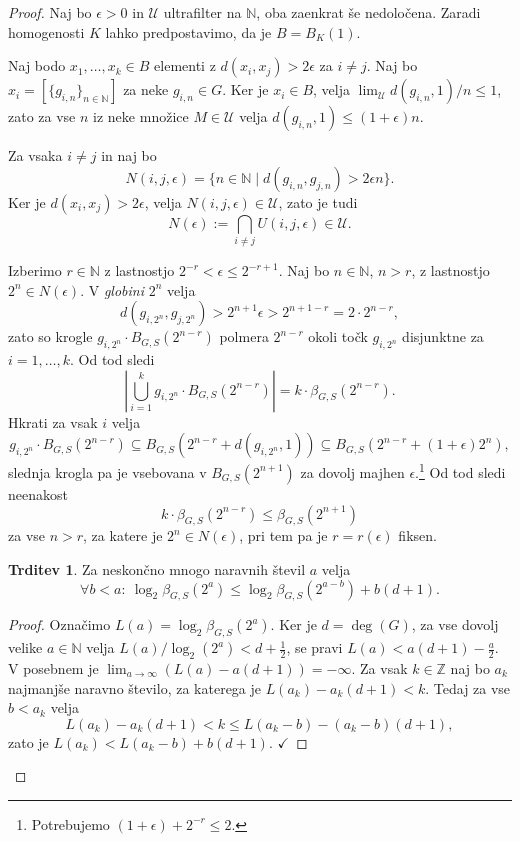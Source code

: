 \documentclass[11pt]{book}
\def\NN{\mathbb{N}}
\def\ZZ{\mathbb{Z}}
\def\UU{\mathcal{U}}
\def\kljuka{$\checkmark$}
\theoremstyle{definition}
\theoremstyle{zgled}
\theoremstyle{odprtproblem}
\theoremstyle{domacanaloga}
\newenvironment{dokaz}
    {\color{siva}\begin{proof}}
    {\end{proof}}
\theoremstyle{izrek}
\newtheorem*{trditev}{Trditev}
\begin{document}
\begin{dokaz}
Naj bo $\epsilon > 0$ in $\UU$ ultrafilter na $\NN$, oba zaenkrat še nedoločena. Zaradi homogenosti $K$ lahko predpostavimo, da je $B = B_K(1)$. 

Naj bodo $x_1, \dots, x_k \in B$ elementi z $d(x_i, x_j) > 2\epsilon$ za $i \neq j$. Naj bo $x_i = [\{ g_{i,n} \}_{n \in \NN}]$ za neke $g_{i,n} \in G$. Ker je $x_i \in B$, velja $\lim_\UU d(g_{i,n}, 1)/n \leq 1$, zato za vse $n$ iz neke množice $M \in \UU$ velja $d(g_{i,n}, 1) \leq (1+\epsilon)n$.

Za vsaka $i \neq j$ in naj bo
\[
N(i,j,\epsilon) = \{ n \in \NN \mid d(g_{i,n}, g_{j,n}) > 2 \epsilon n \}.
\]
Ker je $d(x_i, x_j) > 2 \epsilon$, velja $N(i,j,\epsilon) \in \UU$, zato je tudi
\[
N(\epsilon) := \bigcap_{i \neq j} U(i,j,\epsilon) \in \UU.
\]

Izberimo $r \in \NN$ z lastnostjo $2^{-r} < \epsilon \leq 2^{-r+1}$. Naj bo $n \in \NN$, $n > r$, z lastnostjo $2^n \in N(\epsilon)$. V {\em globini} $2^n$ velja
\[
d(g_{i, 2^n}, g_{j, 2^n}) > 2^{n+1} \epsilon > 2^{n+1-r} = 2 \cdot 2^{n-r},
\]
zato so krogle $g_{i,2^n} \cdot B_{G,S}(2^{n-r})$ polmera $2^{n-r}$ okoli točk $g_{i, 2^n}$ disjunktne za $i = 1, \dots, k$. Od tod sledi
\[
\left| \bigcup_{i = 1}^k g_{i,2^n} \cdot B_{G,S}(2^{n-r}) \right| = k \cdot \beta_{G,S}(2^{n-r}).
\]
Hkrati za vsak $i$ velja
\[
g_{i,2^n} \cdot B_{G,S}(2^{n-r}) \subseteq B_{G,S}(2^{n-r} + d(g_{i, 2^n}, 1)) \subseteq B_{G,S}(2^{n-r} + (1+\epsilon) 2^n),
\]
slednja krogla pa je vsebovana v $B_{G,S}(2^{n+1})$ za dovolj majhen $\epsilon$.\footnote{Potrebujemo $(1+\epsilon) + 2^{-r} \leq 2$.} Od tod sledi neenakost
\[
k \cdot \beta_{G,S}(2^{n-r}) \leq \beta_{G,S}(2^{n+1})
\]
za vse $n > r$, za katere je $2^n \in N(\epsilon)$, pri tem pa je $r = r(\epsilon)$ fiksen.

\begin{trditev}
Za neskončno mnogo naravnih števil $a$ velja
\[
\forall b < a \colon \ \log_2 \beta_{G,S}(2^a) \leq \log_2 \beta_{G,S}(2^{a-b}) + b (d+1).
\]
\end{trditev}

\begin{dokaz}
Označimo $L(a) = \log_2 \beta_{G,S}(2^a)$. Ker je $d = \deg(G)$, za vse dovolj velike $a \in \NN$ velja $L(a)/\log_2(2^a) < d + \frac12$, se pravi $L(a) < a(d+1) - \frac{a}{2}$. V posebnem je $\lim_{a \to \infty} (L(a) - a(d+1)) = - \infty$. Za vsak $k \in \ZZ$ naj bo $a_k$ najmanjše naravno število, za katerega je $L(a_k) - a_k(d+1) < k$. Tedaj za vse $b < a_k$ velja
\[
L(a_k) - a_k(d+1) < k \leq L(a_k - b) - (a_k - b)(d+1),
\]
zato je $L(a_k) < L(a_k - b) + b(d+1)$. \kljuka
\end{dokaz}



\end{dokaz}
\end{document}
